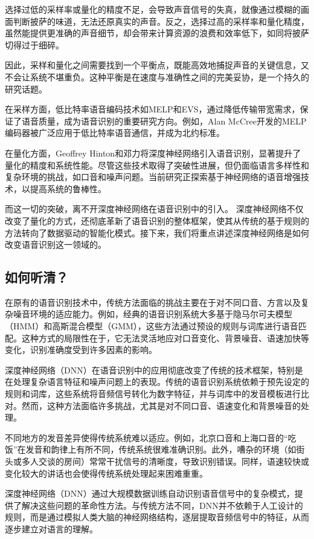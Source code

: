 选择过低的采样率或量化的精度不足，会导致声音信号的失真，就像通过模糊的画面判断披萨的味道，无法还原真实的声音。反之，选择过高的采样率和量化精度，虽然能提供更准确的声音细节，却会带来计算资源的浪费和效率低下，如同将披萨切得过于细碎。

因此，采样和量化之间需要找到一个平衡点，既能高效地捕捉声音的关键信息，又不会让系统不堪重负。这种平衡是在速度与准确性之间的完美妥协，是一个持久的研究话题。

在采样方面，低比特率语音编码技术如MELP和EVS，通过降低传输带宽需求，保证了语音质量，成为语音识别的重要研究方向。例如，Alan McCree开发的MELP编码器被广泛应用于低比特率语音通信，并成为北约标准。

在量化方面，Geoffrey Hinton和邓力将深度神经网络引入语音识别，显著提升了量化的精度和系统性能。尽管这些技术取得了突破性进展，但仍面临语言多样性和复杂环境的挑战，如口音和噪声问题。当前研究正探索基于神经网络的语音增强技术，以提高系统的鲁棒性。

而这一切的突破，离不开深度神经网络在语音识别中的引入。 深度神经网络不仅改变了量化的方式，还彻底革新了语音识别的整体框架，使其从传统的基于规则的方法转向了数据驱动的智能化模式。接下来，我们将重点讲述深度神经网络是如何改变语音识别这一领域的。


\subsection{如何听清？}

在原有的语音识别技术中，传统方法面临的挑战主要在于对不同口音、方言以及复杂噪音环境的适应能力。例如，经典的语音识别系统大多基于隐马尔可夫模型（HMM）和高斯混合模型（GMM），这些方法通过预设的规则与词库进行语音匹配。这种方式的局限性在于，它无法灵活地应对口音变化、背景噪音、语速加快等变化，识别准确度受到许多因素的影响。

深度神经网络（DNN）在语音识别中的应用彻底改变了传统的技术框架，特别是在处理复杂语言特征和噪声问题上的表现。传统的语音识别系统依赖于预先设定的规则和词库，这些系统将音频信号转化为数字特征，并与词库中的发音模板进行比对。然而，这种方法面临许多挑战，尤其是对不同口音、语速变化和背景噪音的处理。

不同地方的发音差异使得传统系统难以适应。例如，北京口音和上海口音的“吃饭”在发音和韵律上有所不同，传统系统很难准确识别。此外，嘈杂的环境（如街头或多人交谈的房间）常常干扰信号的清晰度，导致识别错误。同样，语速较快或变化较大的讲话也会使得传统系统处理起来困难重重。

深度神经网络（DNN）通过大规模数据训练自动识别语音信号中的复杂模式，提供了解决这些问题的革命性方法。与传统方法不同，DNN并不依赖于人工设计的规则，而是通过模拟人类大脑的神经网络结构，逐层提取音频信号中的特征，从而逐步建立对语言的理解。

